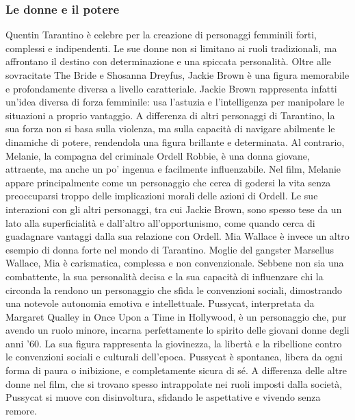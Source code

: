 \documentclass[12pt]{article} %
\begin{document}
\begin{flushleft}
    \subsubsection*{Le donne e il potere}
    Quentin Tarantino è celebre per la creazione di personaggi femminili forti, complessi e indipendenti. Le sue donne non si limitano ai ruoli tradizionali, ma affrontano il destino con determinazione e una spiccata personalità.
    Oltre alle sovracitate The Bride e Shosanna Dreyfus, Jackie Brown è una figura memorabile e profondamente diversa a livello caratteriale. 
    Jackie Brown rappresenta infatti un’idea diversa di forza femminile: usa l’astuzia e l’intelligenza per manipolare le situazioni a proprio vantaggio. A differenza di altri personaggi di Tarantino, la sua forza non si basa sulla violenza, ma sulla capacità di navigare abilmente le dinamiche di potere, rendendola una figura brillante e determinata.
    Al contrario, Melanie, la compagna del criminale Ordell Robbie, è una donna giovane, attraente, ma anche un po’ ingenua e facilmente influenzabile. Nel film, Melanie appare principalmente come un personaggio che cerca di godersi la vita senza preoccuparsi troppo delle implicazioni morali delle azioni di Ordell. Le sue interazioni con gli altri personaggi, tra cui Jackie Brown, sono spesso tese da un lato alla superficialità e dall’altro all’opportunismo, come quando cerca di guadagnare vantaggi dalla sua relazione con Ordell.
    Mia Wallace è invece un altro esempio di donna forte nel mondo di Tarantino. Moglie del gangster Marsellus Wallace, Mia è carismatica, complessa e non convenzionale. Sebbene non sia una combattente, la sua personalità decisa e la sua capacità di influenzare chi la circonda la rendono un personaggio che sfida le convenzioni sociali, dimostrando una notevole autonomia emotiva e intellettuale.
    Pussycat, interpretata da Margaret Qualley in Once Upon a Time in Hollywood, è un personaggio che, pur avendo un ruolo minore, incarna perfettamente lo spirito delle giovani donne degli anni ’60. La sua figura rappresenta la giovinezza, la libertà e la ribellione contro le convenzioni sociali e culturali dell’epoca. Pussycat è spontanea, libera da ogni forma di paura o inibizione, e completamente sicura di sé. A differenza delle altre donne nel film, che si trovano spesso intrappolate nei ruoli imposti dalla società, Pussycat si muove con disinvoltura, sfidando le aspettative e vivendo senza remore.

\end{flushleft}
\end{document}
